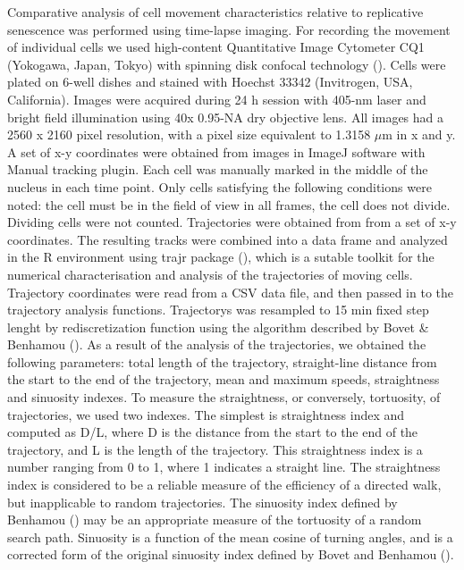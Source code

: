 \documentclass[alpha-refs]{wiley-article}
\begin{document}
Comparative analysis of cell movement characteristics relative to replicative senescence was performed using time-lapse imaging.
For recording the movement of individual cells we used high-content Quantitative Image Cytometer CQ1 (Yokogawa, Japan, Tokyo) with spinning disk confocal technology (\cite{sakashita2015cq1}).
Cells were plated on 6-well dishes and stained with Hoechst 33342 (Invitrogen, USA, California).
Images were acquired during 24 h session with 405-nm laser and bright field illumination using 40x 0.95-NA dry objective lens.
All images had a 2560 x 2160 pixel resolution, with a pixel size equivalent to 1.3158 $\mu$m in x and y.
A set of x-y coordinates were obtained from images in ImageJ software with Manual tracking plugin.
Each cell was manually marked in the middle of the nucleus in each time point.
Only cells satisfying the following conditions were noted: the cell must be in the field of view in all frames, the cell does not divide.
Dividing cells were not counted.
Trajectories were obtained from from a set of x-y coordinates.
The resulting tracks were combined into a data frame and analyzed in the R environment using trajr package (\cite{mclean2018trajr}), which is a sutable toolkit for the numerical characterisation and analysis of the trajectories of moving cells.
Trajectory coordinates were read from a CSV data file, and then passed in to the trajectory analysis functions.
Trajectorys was resampled to 15 min fixed step lenght by rediscretization function using the algorithm described by Bovet \& Benhamou (\cite{bovet1988spatial}).
As a result of the analysis of the trajectories, we obtained the following parameters: total length of the trajectory, straight-line distance from the start to the end of the trajectory, mean and maximum speeds, straightness and sinuosity indexes.
To measure the straightness, or conversely, tortuosity, of trajectories, we used two indexes.
The simplest is straightness index and computed as D/L, where D is the distance from the start to the end of the trajectory, and L is the length of the trajectory.
This straightness index is a number ranging from 0 to 1, where 1 indicates a straight line.
The straightness index is considered to be a reliable measure of the efficiency of a directed walk, but inapplicable to random trajectories.
The sinuosity index defined by Benhamou (\cite{benhamou2004reliably}) may be an appropriate measure of the tortuosity of a random search path.
Sinuosity is a function of the mean cosine of turning angles, and is a corrected form of the original sinuosity index defined by Bovet and Benhamou (\cite{bovet1988spatial}).
\end{document}
